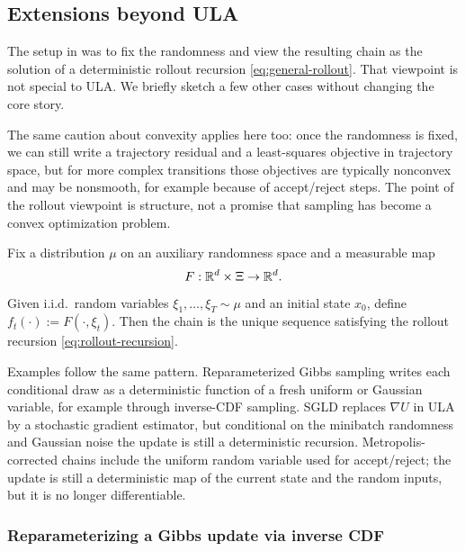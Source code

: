 \documentclass[11pt]{article}
\begin{document}
\subsection{Extensions beyond ULA}
\label{subsec:extensions}

The setup in  was to fix the randomness and view the resulting chain as the solution of a deterministic rollout recursion \eqref{eq:general-rollout}.
That viewpoint is not special to ULA.
We briefly sketch a few other cases without changing the core story.

The same caution about convexity applies here too: once the randomness is fixed, we can still write a trajectory residual and a least-squares objective in trajectory space, but for more complex transitions those objectives are typically nonconvex and may be nonsmooth, for example because of accept/reject steps.
The point of the rollout viewpoint is structure, not a promise that sampling has become a convex optimization problem.

\begin{definition}
\label{def:reparam-transition}
Fix a distribution $\mu$ on an auxiliary randomness space and a measurable map
\[
F:\mathbb{R}^d \times \Xi \to \mathbb{R}^d.
\]
Given i.i.d.\ random variables $\xi_1,\dots,\xi_T \sim \mu$ and an initial state $x_0$, define $f_t(\cdot):=F(\cdot,\xi_t)$.
Then the chain is the unique sequence satisfying the rollout recursion \eqref{eq:rollout-recursion}.
\end{definition}

Examples follow the same pattern.
Reparameterized Gibbs sampling writes each conditional draw as a deterministic function of a fresh uniform or Gaussian variable, for example through inverse-CDF sampling.
SGLD replaces $\nabla U$ in ULA by a stochastic gradient estimator, but conditional on the minibatch randomness and Gaussian noise the update is still a deterministic recursion.
Metropolis-corrected chains include the uniform random variable used for accept/reject; the update is still a deterministic map of the current state and the random inputs, but it is no longer differentiable.

\subsubsection{Reparameterizing a Gibbs update via inverse CDF}
\label{subsubsec:reparam-gibbs}
\end{document}
